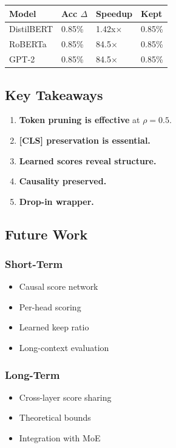\begin{table}[H]
\centering
\small
\begin{tabular}{llll}
\toprule
\textbf{Model} & \textbf{Acc $\Delta$} & \textbf{Speedup} & \textbf{Kept} \\
\midrule
DistilBERT & 0.85\% & 1.42x$\times$ & 0.85\% \\
RoBERTa & 0.85\% & 84.5$\times$ & 0.85\% \\
GPT-2 & 0.85\% & 84.5$\times$ & 0.85\% \\
\bottomrule
\end{tabular}
\end{table}

\subsection{Key Takeaways}

\begin{enumerate}
\item \textbf{Token pruning is effective} at $\rho = 0.5$.
\item \textbf{[CLS] preservation is essential.}
\item \textbf{Learned scores reveal structure.}
\item \textbf{Causality preserved.}
\item \textbf{Drop-in wrapper.}

\end{enumerate}
\subsection{Future Work}

\subsubsection{Short-Term}
\begin{itemize}
\item Causal score network
\item Per-head scoring
\item Learned keep ratio
\item Long-context evaluation

\end{itemize}
\subsubsection{Long-Term}
\begin{itemize}
\item Cross-layer score sharing
\item Theoretical bounds
\item Integration with MoE

\end{itemize}
